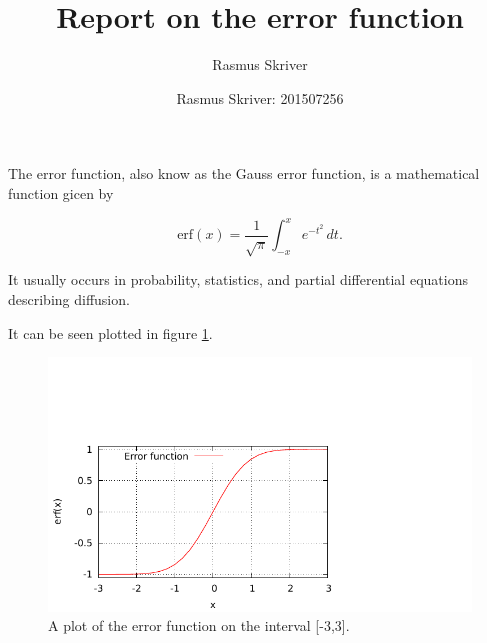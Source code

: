 \documentclass[english,onecolumn]{article}
\begin{document}
\author{Rasmus Skriver}
\title{Report on the error function}
\author{Rasmus Skriver: 201507256}

\maketitle

The error function, also know as the Gauss error function, is a mathematical function gicen by 

\begin{equation}
\textrm{erf}(x)=\frac{1}{\sqrt{\pi}} \int _{-x} ^{x} e^{-t^{2}}\,dt.
\end{equation}

It usually occurs in probability, statistics, and partial differential equations 
describing diffusion.

It can be seen plotted in figure \ref{fig:error}.

\begin{figure}[h]
\centering
\includegraphics{plot.pdf}
\caption{A plot of the error function on the interval [-3,3].}
\label{fig:error}
\end{figure}
\end{document}

